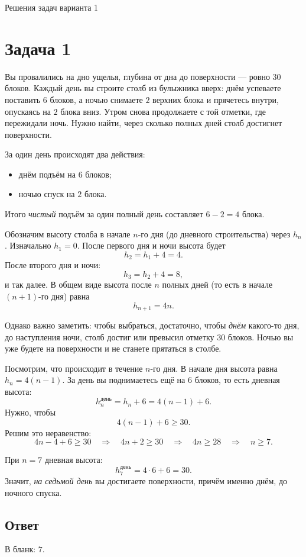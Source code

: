 \documentclass[12pt,a4paper]{article}
\begin{document}
\begin{center}
    {\Large Решения задач варианта 1}\\[1em]
\end{center}


\section*{Задача 1}

Вы провалились на дно ущелья, глубина от дна до поверхности --- ровно $30$ блоков. Каждый день вы строите столб из булыжника вверх: днём успеваете поставить $6$ блоков, а ночью снимаете $2$ верхних блока и прячетесь внутри, опускаясь на $2$ блока вниз. Утром снова продолжаете с той отметки, где пережидали ночь. Нужно найти, через сколько полных дней столб достигнет поверхности.

За один день происходят два действия:
\begin{itemize}
  \item днём подъём на $6$ блоков;
  \item ночью спуск на $2$ блока.
\end{itemize}
Итого \emph{чистый} подъём за один полный день составляет $6 - 2 = 4$ блока.

Обозначим высоту столба в начале $n$-го дня (до дневного строительства) через $h_n$. Изначально $h_1 = 0$. После первого дня и ночи высота будет
\[
h_2 = h_1 + 4 = 4.
\]
После второго дня и ночи:
\[
h_3 = h_2 + 4 = 8,
\]
и так далее. В общем виде высота после $n$ полных дней (то есть в начале $(n+1)$-го дня) равна
\[
h_{n+1} = 4n.
\]

Однако важно заметить: чтобы выбраться, достаточно, чтобы \emph{днём} какого-то дня, до наступления ночи, столб достиг или превысил отметку $30$ блоков. Ночью вы уже будете на поверхности и не станете прятаться в столбе.

Посмотрим, что происходит в течение $n$-го дня. В начале дня высота равна $h_n = 4(n-1)$. За день вы поднимаетесь ещё на $6$ блоков, то есть дневная высота:
\[
h^{\text{день}}_n = h_n + 6 = 4(n-1) + 6.
\]
Нужно, чтобы
\[
4(n-1) + 6 \ge 30.
\]
Решим это неравенство:
\[
4n - 4 + 6 \ge 30 \quad \Rightarrow \quad 4n + 2 \ge 30 \quad \Rightarrow \quad 4n \ge 28 \quad \Rightarrow \quad n \ge 7.
\]

При $n=7$ дневная высота:
\[
h^{\text{день}}_7 = 4 \cdot 6 + 6 = 30.
\]
Значит, \emph{на седьмой день} вы достигаете поверхности, причём именно днём, до ночного спуска.

\subsection*{Ответ}
В бланк: $7$.
\end{document}
